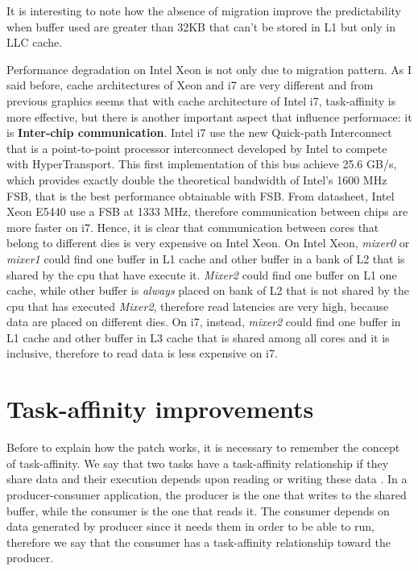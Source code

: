 It is interesting to note how the absence of migration improve the predictability when buffer used are greater than 32KB  that can't be stored in L1 but 
only in LLC cache.

Performance degradation on Intel Xeon is not only due to migration pattern. As I said before, cache architectures of Xeon and i7 are very different and
from previous graphics seems that with cache architecture of Intel i7, task-affinity is more effective, but there is another important aspect that influence
performace: it is \textbf{Inter-chip communication}. Intel i7 use the new Quick-path Interconnect that is a point-to-point processor interconnect developed 
by Intel to compete with HyperTransport. This first implementation of this bus achieve 25.6 GB/s, which provides exactly double the theoretical bandwidth 
of Intel's 1600 MHz FSB, that is the best performance obtainable with FSB. From datasheet, Intel Xeon E5440 use a FSB at 1333 MHz, therefore communication 
between chips are more faster on i7. Hence, it is clear that communication between cores that belong to different dies is very expensive on Intel Xeon. 
On Intel Xeon, \textit{mixer0} or \textit{mixer1} could find one buffer in L1 cache and other buffer in a bank of L2 that is shared by the cpu that 
have execute it. \textit{Mixer2} could find one buffer on L1 one cache, while other buffer is \textit{always} placed on bank of L2 that is not shared 
by the cpu that has executed \textit{Mixer2}, therefore read latencies are very high, because data are placed on different dies. 
On i7, instead, \textit{mixer2} could find one buffer in L1 cache and other buffer in L3 cache that is shared among all cores and it is inclusive, 
therefore to read data is less expensive on i7.

\section{Task-affinity improvements}

Before to explain how the patch works, it is necessary to remember the concept of task-affinity. We say that two tasks have a task-affinity relationship if 
they share data and their execution depends upon reading or writing these data \cite{lcs}. In a producer-consumer application, the producer is the one that 
writes to the shared buffer, while the consumer is the one that reads it. The consumer depends on data generated by producer since it needs them in order 
to be able to run, therefore we say that the consumer has a task-affinity relationship toward the producer.

